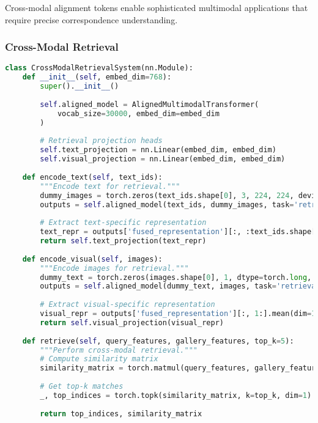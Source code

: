 Cross-modal alignment tokens enable sophisticated multimodal applications that require precise correspondence understanding.

\subsubsection{Cross-Modal Retrieval}

\begin{lstlisting}[language=Python, caption=Cross-modal retrieval with alignment tokens]
class CrossModalRetrievalSystem(nn.Module):
    def __init__(self, embed_dim=768):
        super().__init__()
        
        self.aligned_model = AlignedMultimodalTransformer(
            vocab_size=30000, embed_dim=embed_dim
        )
        
        # Retrieval projection heads
        self.text_projection = nn.Linear(embed_dim, embed_dim)
        self.visual_projection = nn.Linear(embed_dim, embed_dim)
        
    def encode_text(self, text_ids):
        """Encode text for retrieval."""
        dummy_images = torch.zeros(text_ids.shape[0], 3, 224, 224, device=text_ids.device)
        outputs = self.aligned_model(text_ids, dummy_images, task='retrieval')
        
        # Extract text-specific representation
        text_repr = outputs['fused_representation'][:, :text_ids.shape[1]].mean(dim=1)
        return self.text_projection(text_repr)
    
    def encode_visual(self, images):
        """Encode images for retrieval."""
        dummy_text = torch.zeros(images.shape[0], 1, dtype=torch.long, device=images.device)
        outputs = self.aligned_model(dummy_text, images, task='retrieval')
        
        # Extract visual-specific representation
        visual_repr = outputs['fused_representation'][:, 1:].mean(dim=1)  # Skip text token
        return self.visual_projection(visual_repr)
    
    def retrieve(self, query_features, gallery_features, top_k=5):
        """Perform cross-modal retrieval."""
        # Compute similarity matrix
        similarity_matrix = torch.matmul(query_features, gallery_features.t())
        
        # Get top-k matches
        _, top_indices = torch.topk(similarity_matrix, k=top_k, dim=1)
        
        return top_indices, similarity_matrix
\end{lstlisting}

